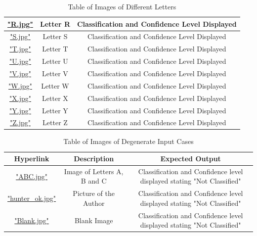 \documentclass[12pt, titlepage]{article}
\begin{document}
\begin{table}[h!]
\begin{tabular}{|c|c|c|}
    \hyperref[R.jpg]{"R.jpg"} & Letter R & Classification and Confidence Level Displayed\\ \hline
    \hyperref[S.jpg]{"S.jpg"} & Letter S & Classification and Confidence Level Displayed\\ \hline
    \hyperref[T.jpg]{"T.jpg"} & Letter T & Classification and Confidence Level Displayed\\ \hline
    \hyperref[U.jpg]{"U.jpg"} & Letter U & Classification and Confidence Level Displayed\\ \hline
    \hyperref[V.jpg]{"V.jpg"} & Letter V & Classification and Confidence Level Displayed\\ \hline
    \hyperref[W.jpg]{"W.jpg"} & Letter W & Classification and Confidence Level Displayed\\ \hline
    \hyperref[X.jpg]{"X.jpg"} & Letter X & Classification and Confidence Level Displayed\\ \hline
    \hyperref[Y.jpg]{"Y.jpg"} & Letter Y & Classification and Confidence Level Displayed\\ \hline
    \hyperref[Z.jpg]{"Z.jpg"} & Letter Z & Classification and Confidence Level Displayed\\ \hline
  \end{tabular}
  \caption{Table of Images of Different Letters}
  \label{table_labels}
\end{table}

\begin{table}[h!]
  \centering
  \begin{tabular}{|c|c|c|}
    \hline
    \textbf{Hyperlink} & \textbf{Description} & \textbf{Expected Output} \\ \hline
    \hyperref[ABC]{"ABC.jpg"} & Image of Letters A, B and C& Classification and Confidence level displayed stating "Not Classified"\\ \hline
    \hyperref[Picture]{"hunter_ok.jpg"} & Picture of the Author & Classification and Confidence level displayed stating "Not Classified" \\ \hline
    \hyperref[Blank]{"Blank.jpg"} & Blank Image & Classification and Confidence level displayed stating "Not Classified" \\ \hline
  \end{tabular}
  \caption{Table of Images of Degenerate Input Cases}
  \label{table_degen}
\end{table}
\end{document}

